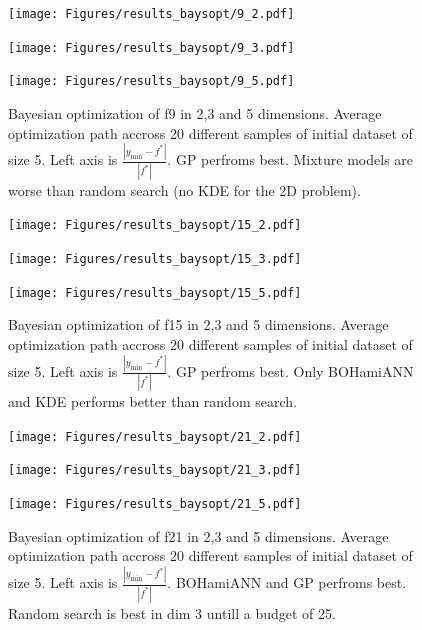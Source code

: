 \begin{figure}[H]
  \centering
  \begin{minipage}[b]{0.32\textwidth}
   \texttt{[image: Figures/results\_baysopt/9\_2.pdf]}
  \end{minipage}
  \hfill
  \begin{minipage}[b]{0.32\textwidth}
    \texttt{[image: Figures/results\_baysopt/9\_3.pdf]}
   \end{minipage}
   \hfill
   \begin{minipage}[b]{0.32\textwidth}
    \texttt{[image: Figures/results\_baysopt/9\_5.pdf]}
   \end{minipage}
  \caption{Bayesian optimization of f9 in 2,3 and 5 dimensions. Average optimization path accross 20 different samples of initial dataset of size 5. 
  Left axis is $\frac{|y_{\min}-f^*|}{|f^*|}$. GP perfroms best. Mixture models are worse than random search (no KDE for the 2D problem).}
  \label{BBOB_bayesOpt1}
\end{figure}

\begin{figure}[H]
  \centering
  \begin{minipage}[b]{0.32\textwidth}
   \texttt{[image: Figures/results\_baysopt/15\_2.pdf]}
  \end{minipage}
  \hfill
  \begin{minipage}[b]{0.32\textwidth}
    \texttt{[image: Figures/results\_baysopt/15\_3.pdf]}
   \end{minipage}
   \hfill
   \begin{minipage}[b]{0.32\textwidth}
    \texttt{[image: Figures/results\_baysopt/15\_5.pdf]}
   \end{minipage}
  \caption{Bayesian optimization of f15 in 2,3 and 5 dimensions. Average optimization path accross 20 different samples of initial dataset of size 5. 
  Left axis is $\frac{|y_{\min}-f^*|}{|f^*|}$. GP perfroms best. Only BOHamiANN and KDE performs better than random search.}
  \label{BBOB_bayesOpt2}
\end{figure}

\begin{figure}[H]
  \centering
  \begin{minipage}[b]{0.32\textwidth}
   \texttt{[image: Figures/results\_baysopt/21\_2.pdf]}
  \end{minipage}
  \hfill
  \begin{minipage}[b]{0.32\textwidth}
    \texttt{[image: Figures/results\_baysopt/21\_3.pdf]}
   \end{minipage}
   \hfill
   \begin{minipage}[b]{0.32\textwidth}
    \texttt{[image: Figures/results\_baysopt/21\_5.pdf]}
   \end{minipage}
  \caption{Bayesian optimization of f21 in 2,3 and 5 dimensions. Average optimization path accross 20 different samples of initial dataset of size 5. 
  Left axis is $\frac{|y_{\min}-f^*|}{|f^*|}$. BOHamiANN and GP perfroms best. Random search is best in dim 3 untill a budget of 25.}
  \label{BBOB_bayesOpt3}
\end{figure}